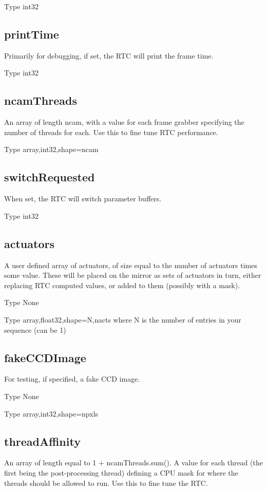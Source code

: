 \documentclass[a4,10pt]{article}
\begin{document}
Type int32

\subsection{printTime}
Primarily for debugging, if set, the RTC will print the frame time.

Type int32

\subsection{ncamThreads}
An array of length ncam, with a value for each frame grabber
specifying the number of threads for each.  Use this to fine tune RTC
performance.

Type array,int32,shape=ncam

\subsection{switchRequested}
When set, the RTC will switch parameter buffers.

Type int32

\subsection{actuators}
A user defined array of actuators, of size equal to the number of
actuators times some value.  These will be placed on the mirror as
sets of actuators in turn, either replacing RTC
computed values, or added to them (possibly with a mask).

Type None

Type array,float32,shape=N,nacts where N is the number of entries in
your sequence (can be 1)

\subsection{fakeCCDImage}
For testing, if specified, a fake CCD image.

Type None

Type array,int32,shape=npxls

\subsection{threadAffinity}
An array of length equal to 1 + ncamThreads.sum().  A value for each
thread (the first being the post-processing thread) defining a CPU
mask for where the threads should be allowed to run.  Use this to fine
tune the RTC.
\end{document}

